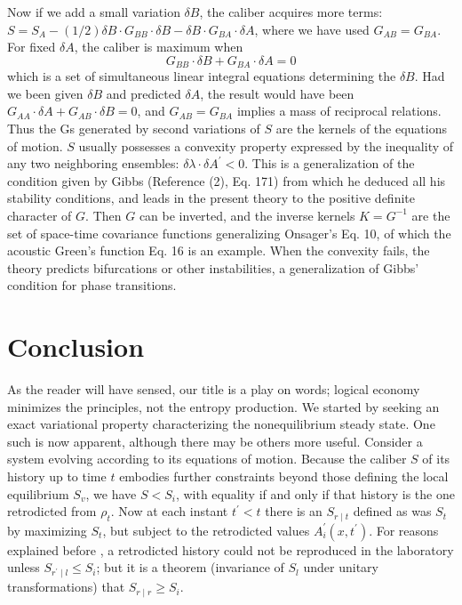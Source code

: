 \documentclass{article}
\begin{document}
Now if we add a small variation $\delta B$, the caliber acquires more terms: $S=S_A-(1 / 2) \delta B \cdot G_{B B} \cdot \delta B-\delta B \cdot G_{B A} \cdot \delta A$, where we have used $G_{A B}=G_{B A}$. For fixed $\delta A$, the caliber is maximum when
$$
G_{B B} \cdot \delta B+G_{B A} \cdot \delta A=0
$$
which is a set of simultaneous linear integral equations determining the $\delta B$. Had we been given $\delta B$ and predicted $\delta A$, the result would have been $G_{A A} \cdot \delta A+G_{A B} \cdot \delta B=0$, and $G_{A B}=G_{B A}$ implies a mass of reciprocal relations. Thus the Gs generated by second variations of $S$ are the kernels of the equations of motion.
$S$ usually possesses a convexity property expressed by the inequality of any two neighboring ensembles: $\delta \lambda \cdot \delta A^{\prime}<0$. This is a generalization of the condition given by Gibbs (Reference (2), Eq. 171) from which he deduced all his stability conditions, and leads in the present theory to the positive definite character of $G$. Then $G$ can be inverted, and the inverse kernels $K=G^{-1}$ are the set of space-time covariance functions generalizing Onsager's Eq. 10, of which the acoustic Green's function Eq. 16 is an example. When the convexity fails, the theory predicts bifurcations or other instabilities, a generalization of Gibbs' condition for phase transitions.

\section{Conclusion}

As the reader will have sensed, our title is a play on words; logical economy minimizes the principles, not the entropy production. We started by seeking an exact variational property characterizing the nonequilibrium steady state. One such is now apparent, although there may be others more useful. Consider a system evolving according to its equations of motion. Because the caliber $S$ of its history up to time $t$ embodies further constraints beyond those defining the local equilibrium $S_v$, we have $S<S_i$, with equality if and only if that history is the one retrodicted from $\rho_t$. Now at each instant $t^{\prime}<t$ there is an $S_{r \mid t}$ defined as was $S_t$ by maximizing $S_t$, but subject to the retrodicted values $A_i^{\prime}\left(x, t^{\prime}\right)$. For reasons explained before \cite{jaynes1963}, a retrodicted history could not be reproduced in the laboratory unless $S_{r^{\prime} \mid l} \leqslant S_i$; but it is a theorem (invariance of $S_l$ under unitary transformations) that $S_{r \mid r} \geqslant S_i$.
\end{document}
